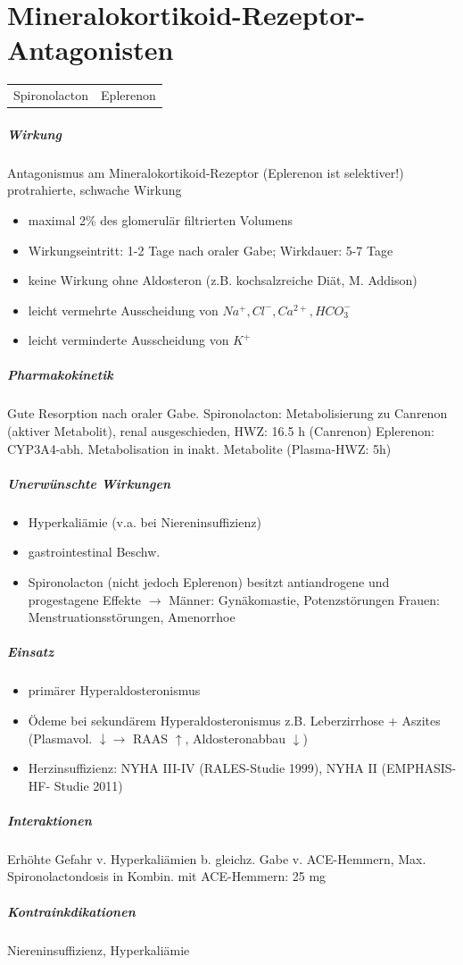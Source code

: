 \documentclass[10pt,a4paper]{report}
\begin{document}
\section{Mineralokortikoid-Rezeptor-Antagonisten}
\begin{tabularx}{\textwidth}{XX}
Spironolacton&Eplerenon\\
\end{tabularx}
\subparagraph{Wirkung}
Antagonismus am Mineralokortikoid-Rezeptor (Eplerenon ist selektiver!) protrahierte, schwache Wirkung
\begin{itemize}
	\item maximal 2\% des glomerulär filtrierten Volumens
	\item Wirkungseintritt: 1-2 Tage nach oraler Gabe; Wirkdauer: 5-7 Tage
	\item keine Wirkung ohne Aldosteron (z.B. kochsalzreiche Diät, M. Addison)
	\item leicht vermehrte Ausscheidung von $Na^+, Cl^-, Ca^{2+}, HCO_3^-$ 
	\item leicht verminderte Ausscheidung von $K^+$
\end{itemize}
\subparagraph{Pharmakokinetik}
Gute Resorption nach oraler Gabe. Spironolacton: Metabolisierung zu Canrenon (aktiver Metabolit), renal ausgeschieden, HWZ: 16.5 h (Canrenon)
Eplerenon: CYP3A4-abh. Metabolisation in inakt. Metabolite (Plasma-HWZ: 5h)
\subparagraph{Unerwünschte Wirkungen}
\begin{itemize}
	\item Hyperkaliämie (v.a. bei Niereninsuffizienz) 
	\item gastrointestinal Beschw.
	\item Spironolacton (nicht jedoch Eplerenon) besitzt antiandrogene und progestagene Effekte  $\rightarrow$ 	Männer: Gynäkomastie, Potenzstörungen Frauen: Menstruationsstörungen, Amenorrhoe
\end{itemize}
\subparagraph{Einsatz}
\begin{itemize}
	\item primärer Hyperaldosteronismus 
	\item Ödeme bei sekundärem Hyperaldosteronismus z.B. Leberzirrhose + Aszites (Plasmavol. $\downarrow \rightarrow$ RAAS $\uparrow$, Aldosteronabbau $\downarrow$) 
	\item Herzinsuffizienz: NYHA III-IV (RALES-Studie 1999), NYHA II (EMPHASIS-HF-	Studie 2011)
\end{itemize}
\subparagraph{Interaktionen} Erhöhte Gefahr v. Hyperkaliämien b. gleichz. Gabe v. ACE-Hemmern, Max. Spironolactondosis in Kombin. mit ACE-Hemmern: 25 mg
\subparagraph{Kontrainkdikationen}Niereninsuffizienz, Hyperkaliämie
\end{document}

